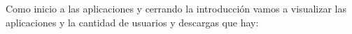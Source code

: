 \documentclass[a4paper, 11pt]{article}
\begin{document}

      Como inicio a las aplicaciones  y cerrando la introducción vamos a visualizar
      las aplicaciones y la cantidad de usuarios y descargas que hay:\\
\end{document}
